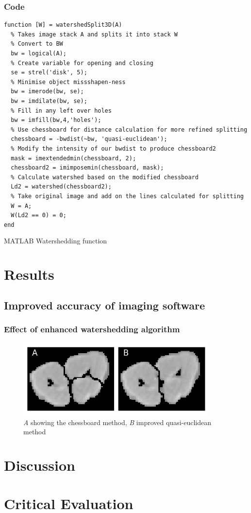 \documentclass[11pt]{report}
\begin{document}
\subsection{Code}
\label{sec-3-2-1}
\begin{listing}[H]
\begin{verbatim}
function [W] = watershedSplit3D(A)
  % Takes image stack A and splits it into stack W
  % Convert to BW
  bw = logical(A);
  % Create variable for opening and closing
  se = strel('disk', 5);
  % Minimise object missshapen-ness
  bw = imerode(bw, se);
  bw = imdilate(bw, se);
  % Fill in any left over holes
  bw = imfill(bw,4,'holes');
  % Use chessboard for distance calculation for more refined splitting
  chessboard = -bwdist(~bw, 'quasi-euclidean');
  % Modify the intensity of our bwdist to produce chessboard2
  mask = imextendedmin(chessboard, 2);
  chessboard2 = imimposemin(chessboard, mask);
  % Calculate watershed based on the modified chessboard
  Ld2 = watershed(chessboard2);
  % Take original image and add on the lines calculated for splitting
  W = A;
  W(Ld2 == 0) = 0;
end
\end{verbatim}
\caption{\label{lst:ws}MATLAB Watershedding function}
\end{listing}

\chapter{Results}
\label{sec-4}

\section{Improved accuracy of imaging software}
\label{sec-4-1}

\subsection{Effect of enhanced watershedding algorithm}
\label{sec-4-1-1}
\begin{center}
\begin{figure}[htb]
\centering
\includegraphics[width=10cm]{./images/chess_quasi.png}
\caption{\label{fig:qe}\emph{A} showing the chessboard method, \emph{B} improved quasi-euclidean method}
\end{figure}
\end{center}

\chapter{Discussion}
\label{sec-5}
\chapter{Critical Evaluation}
\label{sec-6}

\clearpage


\end{document}

